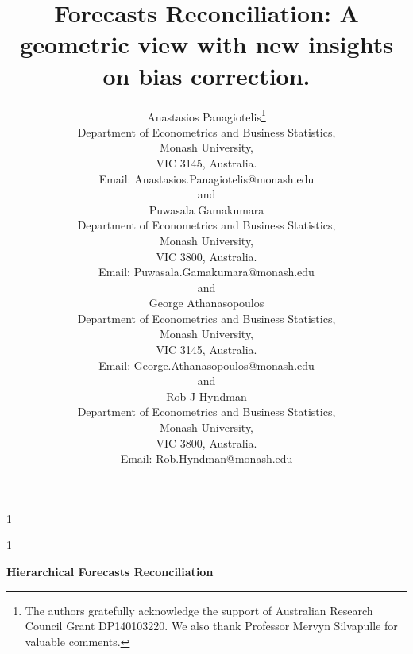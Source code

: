 \documentclass[12pt]{article}
\newcommand{\blind}{1}
\theoremstyle{definition}
\theoremstyle{property}
\begin{document}
	
	
	
	\def\spacingset#1{\renewcommand{\baselinestretch}%
		{#1}\small\normalsize} \spacingset{1}
	
	
	
	\blind
	{
		\title{\bf Forecasts Reconciliation: A geometric view with new insights on bias correction.}
		\author{Anastasios Panagiotelis\thanks{
				The authors gratefully acknowledge the support of Australian Research Council Grant DP140103220.  We also thank Professor Mervyn Silvapulle for valuable comments.}\hspace{.2cm}\\
			Department of Econometrics and Business Statistics,\\
			Monash University,\\ VIC 3145, Australia.\\
			Email: Anastasios.Panagiotelis@monash.edu \\
			and \\
			Puwasala Gamakumara\\
			Department of Econometrics and Business Statistics,\\
			Monash University,\\ VIC 3800, Australia.\\
			Email: Puwasala.Gamakumara@monash.edu \\
			and \\
			George Athanasopoulos\\
			Department of Econometrics and Business Statistics,\\
			Monash University,\\ VIC 3145, Australia.\\
			Email: George.Athanasopoulos@monash.edu \\
			and \\
			Rob J Hyndman\\
			Department of Econometrics and Business Statistics,\\
			Monash University,\\ VIC 3800, Australia.\\
			Email: Rob.Hyndman@monash.edu \\}
		\maketitle
	} \fi
	
	\blind
	{
		\bigskip
		\bigskip
		\bigskip
		\begin{center}
			{\LARGE\bf Hierarchical Forecasts Reconciliation}
		\end{center}
		\medskip
	} \fi
	
\end{document}

